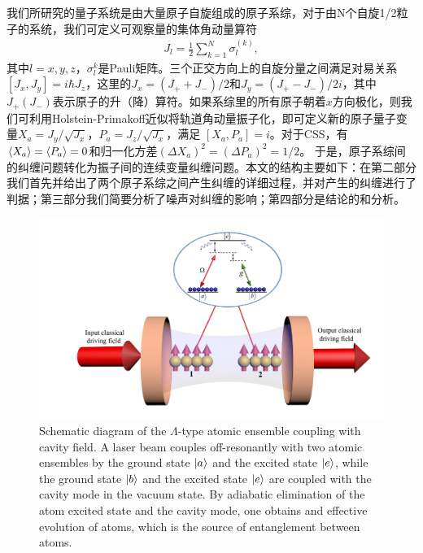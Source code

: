 我们所研究的量子系统是由大量原子自旋组成的原子系综，对于由N个自旋1/2粒子的系统，我们可定义可观察量的集体角动量算符
\begin{align}\label{eq551}
	{J_l} = \frac{1}{2}\sum\limits_{k = 1}^N {\sigma _l^{(k)}} ,
\end{align}
其中$l=x,y,z$，$\sigma_l^{k}$是Pauli矩阵。三个正交方向上的自旋分量之间满足对易关系$[J_x,J_y]=i\hbar J_z$，这里的${J_x} = ({J_ + } + {J_ - })/2$和${J_y} = ({J_ + } - {J_ - })/2i$，其中$J_+(J_-)$表示原子的升（降）算符。如果系综里的所有原子朝着$x$方向极化，则我们可利用Holstein-Primakoff近似\cite{zhang1998even}将轨道角动量振子化，即可定义新的原子量子变量${X_a} = {J_y}/\sqrt {{J_x}} $，${P_a} = {J_z}/\sqrt {{J_x}} $，满足 $[ X_a, P_a] = i$。对于CSS，有$\braket{ X_a}=\braket{ P_a} = 0$和归一化方差${(\Delta {X_a})^2} = {(\Delta { P_a})^2} = 1/2$。
于是，原子系综间的纠缠问题转化为振子间的连续变量纠缠问题。本文的结构主要如下：在第二部分我们首先并给出了两个原子系综之间产生纠缠的详细过程，并对产生的纠缠进行了判据；第三部分我们简要分析了噪声对纠缠的影响；第四部分是结论的和分析。
\begin{figure}[htbp]
	\centering
	\includegraphics[scale=0.35]{Img/Fig_551.pdf}
	{Schematic diagram of the $\Lambda$-type atomic ensemble coupling with cavity field. A laser beam couples off-resonantly with two atomic ensembles by the ground state $\ket{a}$ and the excited state $\ket{e}$, while the ground state $\ket{b}$ and the excited state $\ket{e}$ are coupled with the cavity mode in the vacuum state. By adiabatic elimination of the atom excited state and the cavity mode, one obtains and effective evolution of atoms, which is the source of entanglement between atoms.}
	\label{figure51}
\end{figure}


